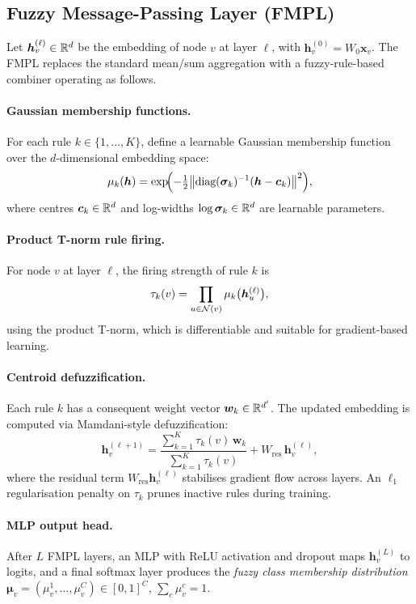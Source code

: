 \subsection{Fuzzy Message-Passing Layer (FMPL)}
\label{sec:fmpl}

Let $\bm{h}_v^{(\ell)} \in \mathbb{R}^d$ be the embedding of node $v$ at layer
$\ell$, with $\bm{h}_v^{(0)} = W_0 \bm{x}_v$.
The FMPL replaces the standard mean/sum aggregation with a fuzzy-rule-based
combiner operating as follows.

\paragraph{Gaussian membership functions.}
For each rule $k \in \{1, \ldots, K\}$, define a learnable Gaussian
membership function over the $d$-dimensional embedding space:
\[
  \mu_k(\bm{h}) = \exp\!\Bigl(
    -\tfrac{1}{2}\bigl\|\text{diag}(\bm{\sigma}_k)^{-1}(\bm{h}-\bm{c}_k)
    \bigr\|^2\Bigr),
\]
where centres $\bm{c}_k \in \mathbb{R}^d$ and log-widths
$\log\bm{\sigma}_k \in \mathbb{R}^d$ are learnable parameters.

\paragraph{Product T-norm rule firing.}
For node $v$ at layer $\ell$, the firing strength of rule $k$ is
\[
  \tau_k(v) = \prod_{u \in \mathcal{N}(v)} \mu_k\bigl(\bm{h}_u^{(\ell)}\bigr),
\]
using the product T-norm, which is differentiable and suitable for
gradient-based learning.

\paragraph{Centroid defuzzification.}
Each rule $k$ has a consequent weight vector $\bm{w}_k \in \mathbb{R}^{d'}$.
The updated embedding is computed via Mamdani-style defuzzification:
\[
  \bm{h}_v^{(\ell+1)}
  = \frac{\sum_{k=1}^K \tau_k(v)\, \bm{w}_k}{\sum_{k=1}^K \tau_k(v)}
    + W_\text{res}\,\bm{h}_v^{(\ell)},
\]
where the residual term $W_\text{res}\bm{h}_v^{(\ell)}$ stabilises
gradient flow across layers.
An $\ell_1$ regularisation penalty on $\tau_k$ prunes inactive rules during
training.

\paragraph{MLP output head.}
After $L$ FMPL layers, an MLP with ReLU activation and dropout maps
$\bm{h}_v^{(L)}$ to logits, and a final softmax layer produces the
\emph{fuzzy class membership distribution}
$\bm{\mu}_v = (\mu_v^1, \ldots, \mu_v^C) \in [0,1]^C$,
$\sum_c \mu_v^c = 1$.

